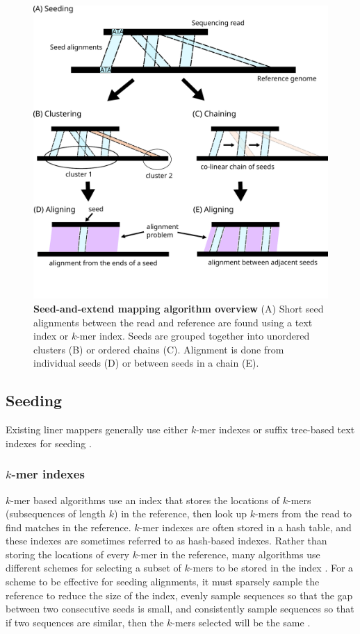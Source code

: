 \documentclass[11pt]{ucscthesis}
\begin{document}
\begin{figure}
\centering
\includegraphics[width=0.8\columnwidth]{mapping_algorithm_overview.pdf}
\caption[Seed-and-extend mapping algorithm overview]{\textbf{Seed-and-extend mapping algorithm overview} (A) Short seed alignments between the read and reference are found using a text index or $k$-mer index. Seeds are grouped together into unordered clusters (B) or ordered chains (C). Alignment is done from individual seeds (D) or between seeds in a chain (E).}
\label{fig:mapping_overview}
\end{figure}


\subsection{Seeding}

Existing liner mappers generally use either $k$-mer indexes or suffix tree-based text indexes for seeding \cite{li_survey_2010,sahlin_survey_2023}.


\subsubsection{$k$-mer indexes}

$k$-mer based algorithms use an index that stores the locations of $k$-mers (subsequences of length $k$) in the reference, then look up $k$-mers from the read to find matches in the reference.
$k$-mer indexes are often stored in a hash table, and these indexes are sometimes referred to as hash-based indexes.
Rather than storing the locations of every $k$-mer in the reference, many algorithms use different schemes for selecting a subset of $k$-mers to be stored in the index \cite{li_minimap2_2018,lee_mosaik_2014,jain_mashmap_2018, edgar_urmap_2020,edgar_syncmers_2021}.
For a scheme to be effective for seeding alignments, it must sparsely sample the reference to reduce the size of the index, evenly sample sequences so that the gap between two consecutive seeds is small, and consistently sample sequences so that if two sequences are similar, then the $k$-mers selected will be the same \cite{marcais_improving_2017}.
\end{document}
